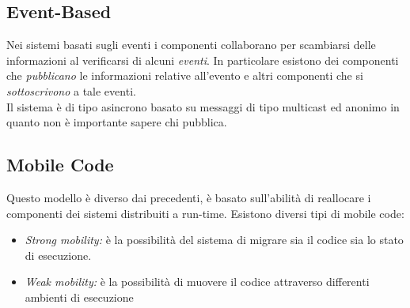 \subsection{Event-Based}
Nei sistemi basati sugli eventi i componenti collaborano per scambiarsi delle informazioni al verificarsi di alcuni \emph{eventi}. In particolare esistono dei componenti che \emph{pubblicano} le informazioni relative all'evento e altri componenti che si \emph{sottoscrivono} a tale eventi.\\
Il sistema è di tipo asincrono basato su messaggi di tipo multicast ed anonimo in quanto non è importante sapere chi pubblica.
\subsection{Mobile Code}
Questo modello è diverso dai precedenti, è basato sull'abilità di reallocare i componenti dei sistemi distribuiti a run-time. Esistono diversi tipi di mobile code:
\begin{itemize}
\item \emph{Strong mobility:} è la possibilità del sistema di migrare sia il codice sia lo stato di esecuzione.
\item \emph{Weak mobility:} è la possibilità di muovere il codice attraverso differenti ambienti di esecuzione
\end{itemize}